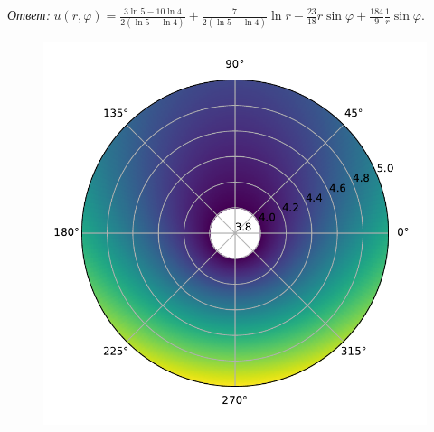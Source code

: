     \noindent \textit{Ответ:} \( u(r, \varphi) = \frac{3 \ln5 - 10 \ln 4}{2(\ln5 - \ln4)} + \frac{7}{2(\ln5 - \ln 4)} \ln r -\frac{23}{18} r \sin \varphi + \frac{184}{9} \frac{1}{r} \sin \varphi \).

    \begin{figure}[H]
        \centering
        \includegraphics[width=14cm]{p2.pdf}
    \end{figure}


